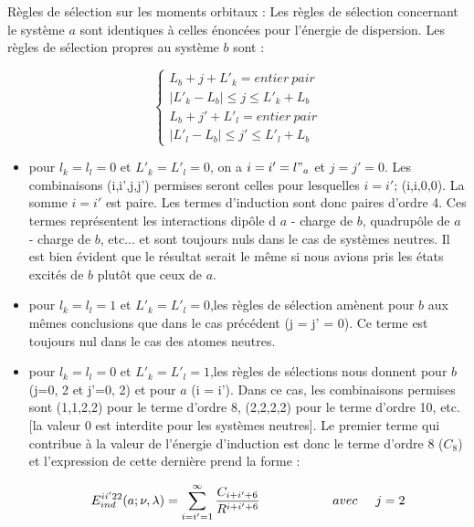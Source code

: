 	Règles de sélection sur les moments orbitaux :
	Les règles de sélection concernant le système $a$ sont identiques à celles énoncées pour l'énergie de dispersion.
	Les règles de sélection propres au système $b$ sont : 
	
	\begin{equation}
	\begin{cases}
	L_{b} + j + L'_{k} = entier\ pair \\
	|L'_{k} - L_{b}| \leq j \leq L'_{k} + L_{b} \\
	L_{b} + j' + L'_{l} = entier\ pair \\
	|L'_{l} - L_{b}| \leq j' \leq L'_{l} + L_{b}
	\end{cases}
	\end{equation}
	
	\begin{itemize}
		\item pour $l_{k} = l_{l} = 0 $ et  $L'_{k} = L'_{l} = 0$, on a $i = i' = l"_{a}$ et $j= j' = 0$. Les combinaisons (i,i',j,j') permises seront celles pour lesquelles $i = i'$; (i,i,0,0). La somme $i = i'$ est paire. Les termes d'induction sont donc paires d'ordre 4. Ces termes représentent les interactions dipôle d $a$ - charge de $b$, quadrupôle de $a$ - charge de $b$, etc... et sont toujours nuls dans le cas de systèmes neutres. Il est bien évident que le résultat serait le même si nous avions pris les états excités de $b$ plutôt que ceux de $a$. 
		\item pour $l_{k} = l_{l} = 1 $ et  $L'_{k} = L'_{l} = 0$,les règles de sélection amènent pour $b$ aux mêmes conclusions que dans le cas précédent (j = j' = 0). Ce terme est toujours nul dans le cas des atomes neutres.
		\item pour $l_{k} = l_{l} = 0 $ et  $L'_{k} = L'_{l} = 1$,les règles de sélections nous donnent pour $b$ (j=0, 2 et j'=0, 2) et pour $a$ (i = i'). Dans ce cas, les combinaisons permises sont (1,1,2,2) pour le terme d'ordre 8, (2,2,2,2) pour le terme d'ordre 10, etc. [la valeur 0 est interdite pour les systèmes neutres]. Le premier terme qui contribue à la valeur de l'énergie d'induction est donc le terme d'ordre 8 ($C_{8}$) et l'expression de cette dernière prend la forme : 
		
		\begin{equation}
		E_{ind}^{ii'22} (a;\nu , \lambda) = \sum_{i=i'=1}^{\infty} \frac{C_{i+i'+6}}{R^{i+i'+6}} \hspace{2cm} avec \hspace{0.5cm} j = 2
		\end{equation}
		
	\end{itemize}
	
